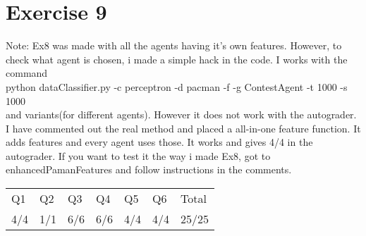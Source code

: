 \section{Exercise 9}
Note: Ex8 was made with all the agents having it's own features. However, to check what agent is chosen, i made a simple hack in the code. I works with the command \\ python dataClassifier.py -c perceptron -d pacman -f -g ContestAgent -t 1000 -s 1000 \\ and variants(for different agents). However it does not work with the autograder. I have commented out the real method and placed a all-in-one feature function. It adds features and every agent uses those. It works and gives 4/4 in the autograder. If you want to test it the way i made Ex8, got to enhancedPamanFeatures and follow instructions in the comments.

\begin{table}[]
\begin{tabular}{lllllll}
Q1  & Q2  & Q3  & Q4  & Q5  & Q6  & Total \\
4/4 & 1/1 & 6/6 & 6/6 & 4/4 & 4/4 & 25/25
\end{tabular}
\end{table}
